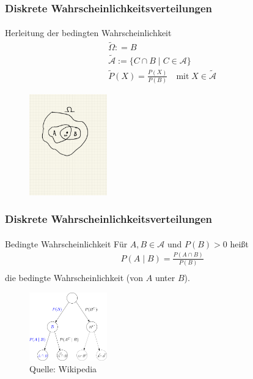 \documentclass{beamer}
\begin{document}
\begin{frame}
    \frametitle{Diskrete Wahrscheinlichkeitsverteilungen}
\framesubtitle{}

\begin{block}{Herleitung der bedingten  Wahrscheinlichkeit}
\begin{align*}
& \tilde{\Omega} : = B \\
& \tilde{\mathcal{A}} := \{ C \cap B  \; | \;  C \in \mathcal{A} \}  \\
& \tilde{P}(X) = \frac{P(X)}{P(B)} \quad \text{mit} \; X \in \tilde{\mathcal{A}}
\end{align*}
\end{block}


\begin{figure}[htp]
      \centering
    \includegraphics[width=0.3\textwidth]{img/bedingtewkeit}
\end{figure}

 \end{frame}


\begin{frame}
    \frametitle{Diskrete Wahrscheinlichkeitsverteilungen}
\framesubtitle{}

\begin{block}{Bedingte  Wahrscheinlichkeit}
Für $A,B \in \mathcal{A}$ und $P(B) > 0$ heißt
\begin{align*}
& P(A \; | \;  B) = \frac{P(A \cap B)}{P(B)} \\
\end{align*}
die bedingte Wahrscheinlichkeit (von $A$ unter $B$).
\end{block}


\begin{figure}[htp]
      \centering
    \includegraphics[width=0.3\textwidth]{img/Probability_tree}

      \caption{Quelle: Wikipedia}
\end{figure}

 \end{frame}
\end{document}
